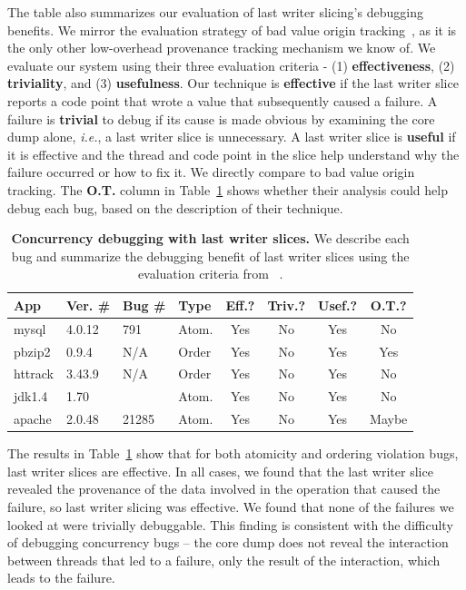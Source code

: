 \documentclass[preprint,9pt]{sigplanconf}
\begin{document}
The table also summarizes our evaluation of last writer slicing's debugging
benefits.  We mirror the evaluation strategy of bad value origin
tracking~\cite{badapples}, as it is the only other low-overhead provenance
tracking mechanism we know of.  We evaluate our system using their three
evaluation criteria - (1) {\bf effectiveness}, (2) {\bf triviality}, and (3)
{\bf usefulness}.  Our technique is {\bf effective} if the last writer slice
reports a code point that wrote a value that subsequently caused a failure.  A
failure is {\bf trivial} to debug if its cause is made obvious by examining the
core dump alone, {\em i.e.}, a last writer slice is unnecessary.  A last writer
slice is {\bf useful} if it is effective and the thread and code point in the
slice help understand why the failure occurred or how to fix it.   We directly
compare to bad value origin tracking.    The {\bf O.T.} column in
Table~\ref{tab:bugs} shows  whether their analysis could help debug each bug,
based on the description of their technique.

\begin{table}
\scriptsize
\centering
\begin{tabular}{l|ll|l|ccc|c}
{\bf App} & {\bf Ver. \#} & {\bf Bug \#} &{\bf Type} & {\bf Eff.?} & {\bf Triv.?} & {\bf Usef.?} & {\bf O.T.?}\\ \hline
mysql  &  4.0.12 &  791     & Atom.  &Yes  &No    & Yes   & No  \\%
pbzip2 &  0.9.4  &  N/A     & Order  &Yes  &No    & Yes   & Yes \\
httrack& 3.43.9  &  N/A     & Order  &Yes  &No    & Yes   & No  \\%
jdk1.4 &  1.70   &          & Atom.  &Yes  &No    & Yes   & No  \\%
apache&  2.0.48 &  21285   & Atom.  &Yes  &No    & Yes   & Maybe\\%
\end{tabular}
\caption{\label{tab:bugs}{\bf Concurrency debugging with last writer slices.} We describe each bug and summarize the debugging benefit of last writer slices using the evaluation criteria from ~\cite{badapples}.  }
\normalsize
\end{table}

The results in Table~\ref{tab:bugs} show that for both atomicity and ordering
violation bugs, last writer slices are effective.  In all cases, we found that
the last writer slice revealed the provenance of the data involved in the
operation that caused the failure, so last writer slicing was effective.  We
found that none of the failures we looked at were trivially debuggable.  This
finding is consistent with the difficulty of debugging concurrency bugs -- the
core dump does not reveal the interaction between threads that led to a
failure, only the result of the interaction, which leads to the failure.  
\end{document}
